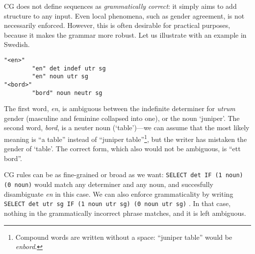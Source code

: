 


CG does not define sequences as \emph{grammatically correct}: it simply aims to add structure to any input.
Even local phenomena, such as gender agreement, is not necessarily enforced.
However, this is often desirable for practical purposes, because it makes the grammar more robust.
Let us illustrate with an example in Swedish.

\begin{verbatim}
"<en>"
        "en" det indef utr sg
        "en" noun utr sg 
"<bord>"
        "bord" noun neutr sg
\end{verbatim}

The first word, \emph{en}, is ambiguous between the indefinite determiner for
\emph{utrum} gender  (masculine and feminine collapsed into one), or the noun `juniper'.
The second word, \emph{bord}, is a neuter noun (`table')---we can assume that the
most likely meaning is ``a table'' instead of ``juniper table''\footnote{Compound words are written without a space: ``juniper table'' would be \emph{enbord}.}, but the writer has mistaken the gender of `table'. The correct form, which also would not be ambiguous, is ``ett bord''.

CG rules can be as fine-grained or broad as we want: 
\texttt{SELECT det IF (1 noun) (0 noun)} would match any determiner and any noun, 
and succesfully disambiguate \emph{en} in this case. 
We can also enforce grammaticality by writing \texttt{SELECT det utr sg IF (1 noun utr sg) (0 noun utr sg)}%
. In that case, nothing in the grammatically incorrect phrase matches, and it is left ambiguous.



